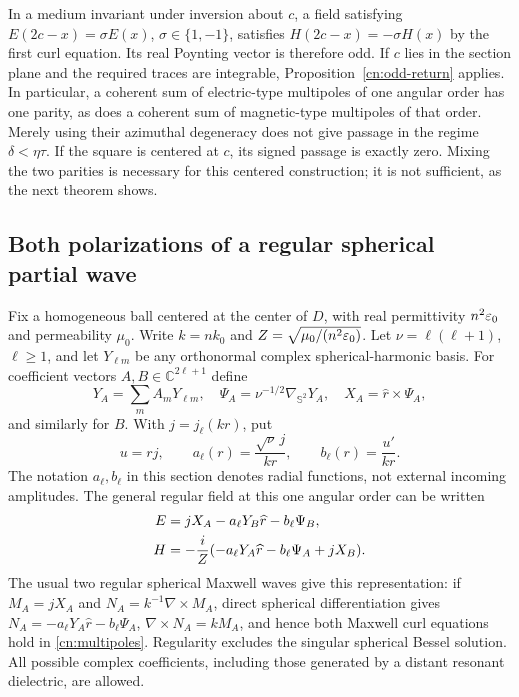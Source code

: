 \begin{remark}
\label{cn:parity}
In a medium invariant under inversion about $c$, a field satisfying
$E(2c-x)=\sigma E(x)$, $\sigma\in\{1,-1\}$, satisfies
$H(2c-x)=-\sigma H(x)$ by the first curl equation.  Its real Poynting
vector is therefore odd.  If $c$ lies in the section plane and the
required traces are integrable, Proposition~\ref{cn:odd-return} applies.
In particular, a coherent sum of electric-type multipoles of one
angular order has one parity, as does a coherent sum of magnetic-type
multipoles of that order.  Merely using their azimuthal degeneracy does
not give passage in the regime $\delta<\eta\tau$.  If the square is
centered at $c$, its signed passage is exactly zero.  Mixing the two
parities is necessary for this centered construction; it is not
sufficient, as the next theorem shows.
\end{remark}

\subsection{Both polarizations of a regular spherical partial wave}

Fix a homogeneous ball centered at the center of $D$, with real
permittivity $n^2\varepsilon_0$ and permeability $\mu_0$.  Write
$k=nk_0$ and $Z=\sqrt{\mu_0/(n^2\varepsilon_0)}$.  Let
$\nu=\ell(\ell+1)$, $\ell\geq1$, and let $Y_{\ell m}$ be any
orthonormal complex spherical-harmonic basis.  For coefficient vectors
$A,B\in\mathbb C^{2\ell+1}$ define
\begin{equation}\label{cn:angular-fields}
 Y_A=\sum_m A_mY_{\ell m},\quad
 \Psi_A=\nu^{-1/2}\nabla_{\mathbb S^2}Y_A,\quad
 X_A=\widehat r\times\Psi_A,
\end{equation}
and similarly for $B$.  With $j=j_\ell(kr)$, put
\begin{equation}\label{cn:radial-fields}
 u=rj,\qquad a_\ell(r)=\frac{\sqrt\nu\,j}{kr},\qquad
 b_\ell(r)=\frac{u'}{kr}.
\end{equation}
The notation $a_\ell,b_\ell$ in this section denotes radial functions,
not external incoming amplitudes.  The general regular field at this
one angular order can be written
\begin{align}
 E&=jX_A-a_\ell Y_B\widehat r-b_\ell\Psi_B,\notag\\
 H&=-\frac{i}{Z}
       (-a_\ell Y_A\widehat r-b_\ell\Psi_A+jX_B).
 \label{cn:multipoles}
\end{align}
The usual two regular spherical Maxwell waves give this representation:
if $M_A=jX_A$ and $N_A=k^{-1}\nabla\times M_A$, direct spherical
differentiation gives
$N_A=-a_\ell Y_A\widehat r-b_\ell\Psi_A$,
$\nabla\times N_A=kM_A$, and hence both Maxwell curl equations
hold in \eqref{cn:multipoles}.  Regularity excludes the singular
spherical Bessel solution.  All possible complex coefficients,
including those generated by a distant resonant dielectric, are allowed.

